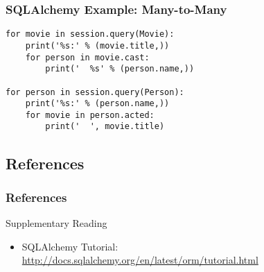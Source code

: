 \documentclass[dvipsnames]{beamer}
\theoremstyle{plain}
\begin{document}
\begin{frame}[fragile]
  \frametitle{SQLAlchemy Example: Many-to-Many}

  \begin{lstlisting}
for movie in session.query(Movie):
    print('%s:' % (movie.title,))
    for person in movie.cast:
        print('  %s' % (person.name,))

for person in session.query(Person):
    print('%s:' % (person.name,))
    for movie in person.acted:
        print('  ', movie.title)
  \end{lstlisting}
\end{frame}

\subsection*{References}

\begin{frame}
  \frametitle{References}

  \begin{block}{Supplementary Reading}
    \begin{itemize}
    \item SQLAlchemy Tutorial:\\
      \url{http://docs.sqlalchemy.org/en/latest/orm/tutorial.html}
    \end{itemize}
  \end{block}
\end{frame}
\end{document}
